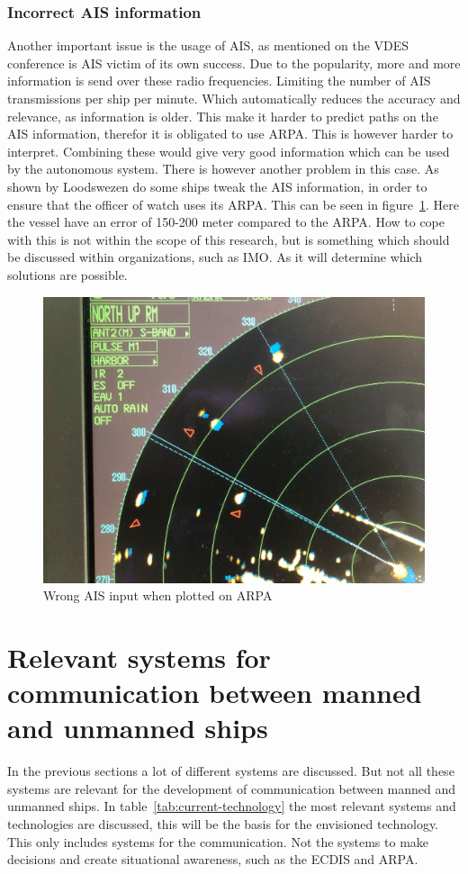 \subsubsection{Incorrect AIS information}
Another important issue is the usage of AIS, as mentioned on the \acf{VDES} conference is AIS victim of its own success. Due to the popularity, more and more information is send over these radio frequencies. Limiting the number of AIS transmissions per ship per minute. Which automatically reduces the accuracy and relevance, as information is older. This make it harder to predict paths on the AIS information, therefor it is obligated to use \acf{ARPA}. This is however harder to interpret. Combining these would give very good information which can be used by the autonomous system.
There is however another problem in this case. As shown by Loodswezen do some ships tweak the AIS information, in order to ensure that the officer of watch uses its \ac{ARPA}. This can be seen in figure~\ref{fig:wrong-AIS}. Here the vessel have an error of 150-200 meter compared to the \ac{ARPA}. How to cope with this is not within the scope of this research, but is something which should be discussed within organizations, such as \acf{IMO}. As it will determine which solutions are possible.

\begin{figure}[bhp]
	\centering
	\includegraphics[width=.9\textwidth]{ais1.jpg}
	\caption{Wrong AIS input when plotted on ARPA}
	\label{fig:wrong-AIS}
\end{figure}

\section{Relevant systems for communication between manned and unmanned ships}
\label{sec:relevant-systems}
In the previous sections a lot of different systems are discussed. But not all these systems are relevant for the development of communication between manned and unmanned ships. In table~\ref{tab:current-technology} the most relevant systems and technologies are discussed, this will be the basis for the envisioned technology.
This only includes systems for the communication. Not the systems to make decisions and create situational awareness, such as the ECDIS and ARPA.

